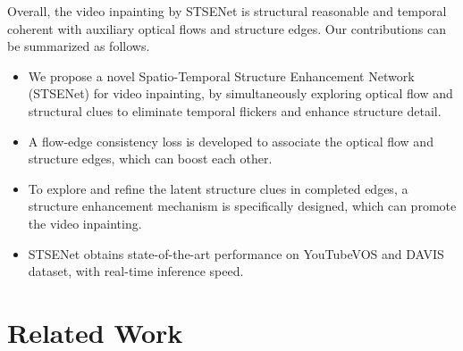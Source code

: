 Overall, the video inpainting by STSENet is structural reasonable and temporal coherent with auxiliary optical flows and structure edges.
Our contributions can be summarized as follows.
\begin{itemize}
	\item We propose a novel Spatio-Temporal Structure Enhancement Network (STSENet) for video inpainting, by simultaneously exploring optical flow and structural clues to eliminate temporal flickers and enhance structure detail. 
	\item A flow-edge consistency loss is developed to associate the optical flow and structure edges, which can boost each other.
	\item To explore and refine the latent structure clues in completed edges, a structure enhancement mechanism is specifically designed, which can promote the video inpainting.	
	\item STSENet obtains state-of-the-art performance on YouTubeVOS and DAVIS dataset, with real-time inference speed.	
\end{itemize}





\section{Related Work}
